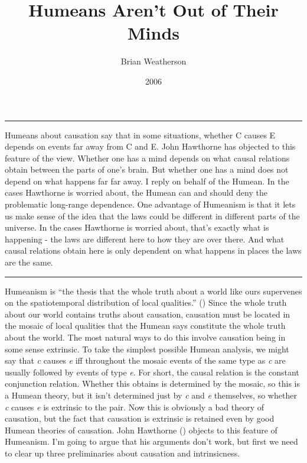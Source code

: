 \documentclass[
  10pt,
  letterpaper,
  DIV=11,
  numbers=noendperiod,
  twoside]{scrartcl}
\title{Humeans Aren't Out of Their Minds}
\author{Brian Weatherson}
\date{2006}
\renewenvironment{abstract}
 {\vspace{-1.25cm}
 \quotation\small\noindent\rule{\linewidth}{.5pt}\par\smallskip
 \noindent }
 {\par\noindent\rule{\linewidth}{.5pt}\endquotation}
\begin{document}
\maketitle
\begin{abstract}
Humeans about causation say that in some situations, whether C causes E
depends on events far away from C and E. John Hawthorne has objected to
this feature of the view. Whether one has a mind depends on what causal
relations obtain between the parts of one's brain. But whether one has a
mind does not depend on what happens far far away. I reply on behalf of
the Humean. In the cases Hawthorne is worried about, the Humean can and
should deny the problematic long-range dependence. One advantage of
Humeanism is that it lets us make sense of the idea that the laws could
be different in different parts of the universe. In the cases Hawthorne
is worried about, that's exactly what is happening - the laws are
different here to how they are over there. And what causal relations
obtain here is only dependent on what happens in places the laws are the
same.
\end{abstract}


Humeanism is ``the thesis that the whole truth about a world like ours
supervenes on the spatiotemporal distribution of local qualities.''
() Since the whole truth about
our world contains truths about causation, causation must be located in
the mosaic of local qualities that the Humean says constitute the whole
truth about the world. The most natural ways to do this involve
causation being in some sense extrinsic. To take the simplest possible
Humean analysis, we might say that \emph{c} causes \emph{e} iff
throughout the mosaic events of the same type as \emph{c} are usually
followed by events of type \emph{e}. For short, the causal relation is
the constant conjunction relation. Whether this obtains is determined by
the mosaic, so this is a Humean theory, but it isn't determined just by
\emph{c} and \emph{e} themselves, so whether \emph{c} causes \emph{e} is
extrinsic to the pair. Now this is obviously a bad theory of causation,
but the fact that causation is extrinsic is retained even by good Humean
theories of causation. John Hawthorne
() objects to this feature of
Humeanism. I'm going to argue that his arguments don't work, but first
we need to clear up three preliminaries about causation and
intrinsicness.
\end{document}
